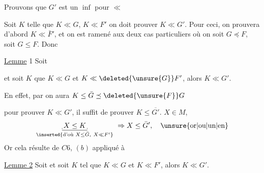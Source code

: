  Prouvons que $G'$ est un $\inf$ pour $\ll$

Soit $K$ telle que $K\ll G$, $K\ll F'$ on doit prouver $K\ll G'$. Pour ceci, on prouvera d'abord $K\ll\bar F'$, et on est ramené aux deux cas particuliers où on  soit $G\preceq F$, soit $G\leq F$. Donc

\uline{Lemme} 1 Soit


et soit $K$  que $K\ll G$ et $K\ll\deleted{\unsure{G}}F'$, alors $K\ll G'$.

En effet, par   on aura $K\leq\bar G\preceq\deleted{\unsure{F}}G$


pour prouver $K\ll G'$, il suffit de prouver $K\leq\overline{G'}$.    $X\in M$,
\[
 \underset{\inserted{\text{d'où } X\leq\bar G,\ X\ll F'}}{\underline{\rule[-.5ex]{.3pt}{.45ex}\,X\leq K\,\rule[-.5ex]{.3pt}{.45ex}}}\ \Rightarrow X\leq\bar G',
 \quad\text{\unsure{or|ou|un|en}}
\]
Or cela résulte de $C6$, $(b)$ appliqué à



\uline{Lemme 2} Soit
et soit $K$ tel que $K\ll G$ et $K\ll F'$, alors $K\ll G'$.

